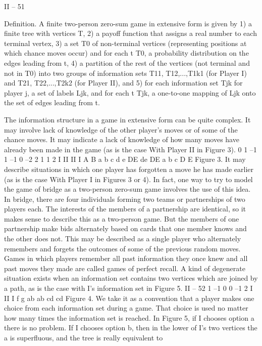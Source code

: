 II – 51
\begin{framed}
Definition. A finite two-person zero-sum game in extensive form is given by
1) a finite tree with vertices T,
2) a payoff function that assigns a real number to each terminal vertex,
3) a set T0 of non-terminal vertices (representing positions at which chance moves
occur) and for each t \in T0, a probability distribution on the edges leading from t,
4) a partition of the rest of the vertices (not terminal and not in T0) into two groups
of information sets T11, T12,...,T1k1 (for Player I) and T21, T22,...,T2k2 (for Player II),
and
5) for each information set Tjk for player j, a set of labels Ljk, and for each t \in Tjk,
a one-to-one mapping of Ljk onto the set of edges leading from t.
\end{framed}
The information structure in a game in extensive form can be quite complex. It may
involve lack of knowledge of the other player’s moves or of some of the chance moves. It
may indicate a lack of knowledge of how many moves have already been made in the game
(as is the case With Player II in Figure 3).
0
1 –1 1 –1 0 –2 2 1
1 2
I
II II
I
A B
a b c d
e
DE de DE a b c
D E
Figure 3.
It may describe situations in which one player has forgotten a move he has made
earlier (as is the case With Player I in Figures 3 or 4). In fact, one way to try to model
the game of bridge as a two-person zero-sum game involves the use of this idea. In bridge,
there are four individuals forming two teams or partnerships of two players each. The
interests of the members of a partnership are identical, so it makes sense to describe this
as a two-person game. But the members of one partnership make bids alternately based
on cards that one member knows and the other does not. This may be described as a
single player who alternately remembers and forgets the outcomes of some of the previous
random moves. Games in which players remember all past information they once knew
and all past moves they made are called games of perfect recall.
A kind of degenerate situation exists when an information set contains two vertices
which are joined by a path, as is the case with I’s information set in Figure 5.
II – 52
1
–1 0 0 –1
2
I
II
I
f g
ab ab
cd cd
Figure 4.
We take it as a convention that a player makes one choice from each information set
during a game. That choice is used no matter how many times the information set is
reached. In Figure 5, if I chooses option a there is no problem. If I chooses option b, then
in the lower of I’s two vertices the a is superfluous, and the tree is really equivalent to
